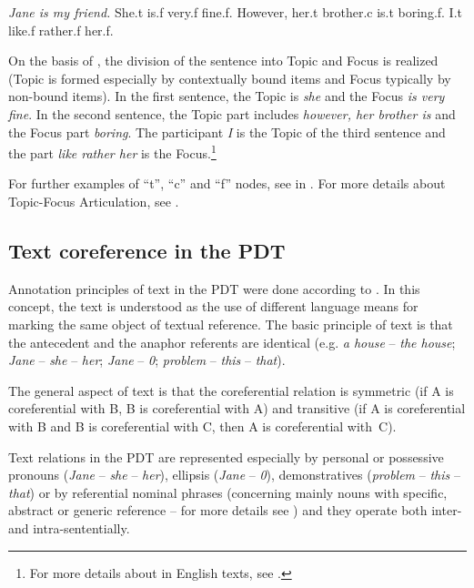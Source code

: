 \documentclass[output=paper]{langsci/langscibook.cls}
\begin{document}
\ea
\label{ex:rysovak:1}
{\ob}\textit{Jane is my friend.{\cb}} She.t is.f very.f fine.f. However, her.t brother.c is.t boring.f. I.t like.f rather.f her.f. \\
\z

On the basis of , the division of the sentence into Topic and Focus is realized (Topic is formed especially by contextually bound items and Focus typically by non-bound items). In the first sentence, the Topic is \textit{she} and the Focus \textit{is very fine}. In the second sentence, the Topic part includes \textit{however, her brother is} and the Focus part \textit{boring}. The participant \textit{I} is the Topic of the third sentence and the part \textit{like rather her} is the Focus.\footnote{For more details about  in English texts, see \citet{Rysova2015Topic}.}

For further examples of ``t'', ``c'' and ``f'' nodes, see  in . For more details about Topic-Focus Articulation, see \citet{hajicova1998topic}.

\subsection{Text coreference in the PDT\label{rysova_k:sec:TextCoreference}}

Annotation principles of text  in the PDT were done according to \citet{Nedoluzhko2011}. In this concept, the text  is understood as the use of different language means for marking the same object of textual reference. The basic principle of text  is that the antecedent and the anaphor referents are identical (e.g. \textit{a house} -- \textit{the house}; \textit{Jane} -- \textit{she} --\textit{ her}; \textit{Jane} -- \textit{0}; \textit{problem} -- \textit{this} -- \textit{that}).

The general aspect of text  is that the coreferential relation is symmetric (if A is coreferential with B, B is coreferential with A) and transitive (if A is coreferential with B and B is coreferential with C, then A is coreferential with~C).

Text  relations in the PDT are represented especially by personal or possessive pronouns (\textit{Jane} -- \textit{she} -- \textit{her}), ellipsis (\textit{Jane }-- \textit{0}), demonstratives (\textit{problem} -- \textit{this }-- \textit{that}) or by referential nominal phrases (concerning mainly nouns with specific, abstract or generic reference -- for more details see \citet{Nedoluzhko2011}) and they operate both inter- and intra-sententially.
\end{document}
